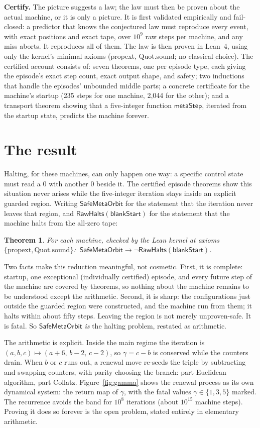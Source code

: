\documentclass[11pt]{article}
\newtheorem{theorem}{Theorem}
\newcommand{\Halts}{\mathsf{RawHalts}}
\newcommand{\Safe}{\mathsf{SafeMetaOrbit}}
\begin{document}
\textbf{Certify.} The picture suggests a law; the law must then be
proven about the actual machine, or it is only a picture. It is
first validated empirically and fail-closed: a predictor that knows the
conjectured law must reproduce every event, with exact positions and exact
tape, over $10^{9}$ raw steps per machine, and any miss aborts. It
reproduces all of them. The law is then proven in Lean~4, using only the
kernel's minimal axioms (\textsf{propext}, \textsf{Quot.sound}; no
classical choice). The certified account consists of: seven theorems,
one per episode type, each giving the episode's exact step count,
exact output shape, and safety; two inductions that handle the
episodes' unbounded middle parts; a concrete certificate for the
machine's startup (235 steps for one machine, 2{,}044 for the other);
and a transport theorem showing that a five-integer function
$\mathsf{metaStep}$, iterated from the startup state, predicts the
machine forever.

\section{The result}
Halting, for these machines, can only happen one way: a specific
control state must read a 0 with another 0 beside it. The certified
episode theorems show this situation never arises while the
five-integer iteration stays inside an explicit guarded region.
Writing $\Safe$ for the statement that the iteration never leaves
that region, and $\Halts(\mathsf{blankStart})$ for the statement
that the machine halts from the all-zero tape:

\begin{theorem}
For each machine, checked by the Lean kernel at axioms
$\{\mathrm{propext},\mathrm{Quot.sound}\}$:
$\ \Safe \rightarrow \lnot\Halts(\mathsf{blankStart})$.
\end{theorem}

Two facts make this reduction meaningful, not cosmetic. First,
it is complete: startup, one exceptional (individually certified)
episode, and every future
step of the machine are covered by theorems, so nothing about the
machine remains to be understood except the arithmetic. Second, it is
sharp: the configurations just outside the guarded region were
constructed, and the machine run from them; it halts within about fifty
steps. Leaving the region is not merely unproven-safe. It is fatal.
So $\Safe$ \emph{is} the halting problem, restated as arithmetic.

The arithmetic is explicit. Inside the main regime the iteration is
$(a,b,c) \mapsto (a{+}6,\,b{-}2,\,c{-}2)$, so $\gamma = c - b$ is
conserved while the counters drain. When $b$ or $c$ runs out, a
renewal move re-seeds the triple by subtracting and swapping counters,
with parity choosing the branch: part Euclidean algorithm, part
Collatz. Figure~\ref{fig:gamma} shows the renewal process as its own
dynamical system: the return map of $\gamma$, with the fatal values
$\gamma \in \{1,3,5\}$ marked. The recurrence avoids the band for $10^{8}$
iterations (about $10^{15}$ machine steps). Proving it does so forever
is the open problem, stated entirely in elementary arithmetic.
\end{document}
